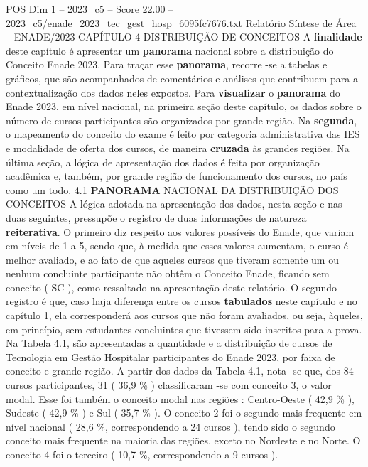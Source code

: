 \begin{textsample}{POS Dim 1 – 2023\_c5 – Score 22.00 – 2023\_c5/enade\_2023\_tec\_gest\_hosp\_6095fc7676.txt}  \label{ex:f1_pos_013}
Relatório Síntese de Área – ENADE/2023 CAPÍTULO 4 DISTRIBUIÇÃO DE CONCEITOS A \textbf{finalidade} deste capítulo é apresentar um \textbf{panorama} nacional sobre a distribuição do Conceito Enade 2023.
Para traçar esse \textbf{panorama}, recorre -se a tabelas e gráficos, que são acompanhados de comentários e análises que contribuem para a contextualização dos dados neles expostos.
Para \textbf{visualizar} o \textbf{panorama} do Enade 2023, em nível nacional, na primeira seção deste capítulo, os dados sobre o número de cursos participantes são organizados por grande região.
Na \textbf{segunda}, o mapeamento do conceito do exame é feito por categoria administrativa das IES e modalidade de oferta dos cursos, de maneira \textbf{cruzada} às grandes regiões.
Na última seção, a lógica de apresentação dos dados é feita por organização acadêmica e, também, por grande região de funcionamento dos cursos, no país como um todo. 4.1 \textbf{PANORAMA} NACIONAL DA DISTRIBUIÇÃO DOS CONCEITOS A lógica adotada na apresentação dos dados, nesta seção e nas duas seguintes, pressupõe o registro de duas informações de natureza \textbf{reiterativa}.
O primeiro diz respeito aos valores possíveis do Enade, que variam em níveis de 1 a 5, sendo que, à medida que esses valores aumentam, o curso é melhor avaliado, e ao fato de que aqueles cursos que tiveram somente um ou nenhum concluinte participante não obtêm o Conceito Enade, ficando sem conceito ( SC ), como ressaltado na apresentação deste relatório.
O segundo registro é que, caso haja diferença entre os cursos \textbf{tabulados} neste capítulo e no capítulo 1, ela corresponderá aos cursos que não foram avaliados, ou seja, àqueles, em princípio, sem estudantes concluintes que tivessem sido inscritos para a prova.
Na Tabela 4.1, são apresentadas a quantidade e a distribuição de cursos de Tecnologia em Gestão Hospitalar participantes do Enade 2023, por faixa de conceito e grande região.
A partir dos dados da Tabela 4.1, nota -se que, dos 84 cursos participantes, 31 ( 36,9 \% ) classificaram -se com conceito 3, o valor modal.
Esse foi também o conceito modal nas regiões : Centro-Oeste ( 42,9 \% ), Sudeste ( 42,9 \% ) e Sul ( 35,7 \% ).
O conceito 2 foi o segundo mais frequente em nível nacional ( 28,6 \%, correspondendo a 24 cursos ), tendo sido o segundo conceito mais frequente na maioria das regiões, exceto no Nordeste e no Norte.
O conceito 4 foi o terceiro ( 10,7 \%, correspondendo a 9 cursos ).

\end{textsample}
